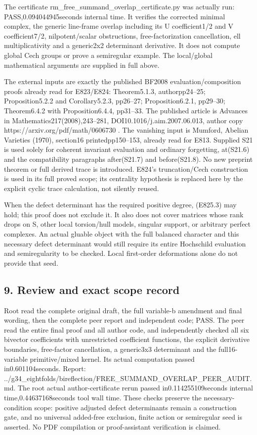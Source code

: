The certificate rm\_free\_summand\_overlap\_certificate.py was actually
run: PASS,0.094044945seconds internal time. It verifies the corrected
minimal complex, the generic line-frame overlap including its U
coefficient1/2 and V coefficient7/2, nilpotent/scalar obstructions,
free-factorization cancellation, ell multiplicativity and a generic2x2
determinant derivative. It does not compute global Cech groups or prove
a semiregular example. The local/global mathematical arguments are
supplied in full above.

The external inputs are exactly the published BF2008
evaluation/composition proofs already read for E823/E824: Theorem5.1.3,
authorpp24--25; Proposition5.2.2 and Corollary5.2.3, pp26--27;
Proposition6.2.1, pp29--30; Theorem6.4.2 with Proposition6.4.4,
pp31--33. The published article is Advances in
Mathematics217(2008),243--281, DOI10.1016/j.aim.2007.06.013, author copy
https://arxiv.org/pdf/math/0606730 . The vanishing input is Mumford,
Abelian Varieties (1970), section16 printedpp150--153, already read for
E813. Supplied S21 is used solely for coherent invariant evaluation and
ordinary forgetting, at(S21.6) and the compatibility paragraphs
after(S21.7) and before(S21.8). No new preprint theorem or full derived
trace is introduced. E824's truncation/Cech construction is used in its
full proved scope; its centrality hypothesis is replaced here by the
explicit cyclic trace calculation, not silently reused.

When the defect determinant has the required positive degree, (E825.3)
may hold; this proof does not exclude it. It also does not cover
matrices whose rank drops on S, other local torsion/hull models,
singular support, or arbitrary perfect complexes. An actual gluable
object with the full balanced character and this necessary defect
determinant would still require its entire Hochschild evaluation and
semiregularity to be checked. Local first-order deformations alone do
not provide that seed.

\subsection{9. Review and exact scope
record}\label{SF-E825:review-and-exact-scope-record}

Root read the complete original draft, the full variable-b amendment and
final wording, then the complete peer report and independent code; PASS.
The peer read the entire final proof and all author code, and
independently checked all six bivector coefficients with unrestricted
coefficient functions, the explicit derivative boundaries, free-factor
cancellation, a generic3x3 determinant and the full16-variable
primitive/mixed kernel. Its actual computation passed in0.601104seconds.
Report:
../g34\_eightfolds/bireflection/FREE\_SUMMAND\_OVERLAP\_PEER\_AUDIT.md.
The root actual author-certificate rerun passed in0.114255109seconds
internal time,0.44637168seconds tool wall time. These checks preserve
the necessary-condition scope: positive adjusted defect determinants
remain a construction gate, and no universal added-free exclusion,
finite action or semiregular seed is asserted. No PDF compilation or
proof-assistant verification is claimed.
